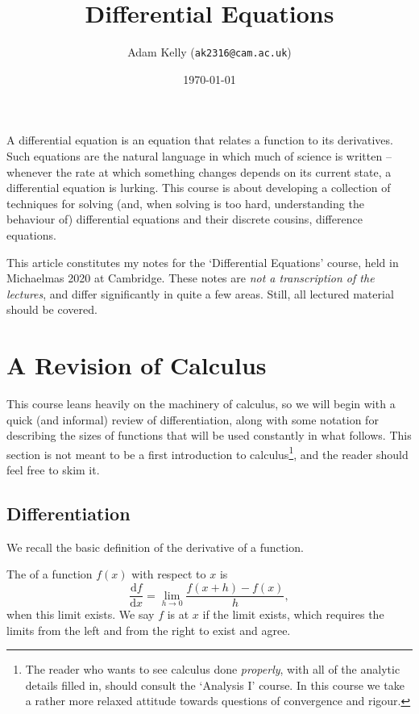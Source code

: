\documentclass[a4paper]{scrartcl}
\title{Differential Equations}
\author{Adam Kelly (\texttt{ak2316@cam.ac.uk})}
\date{\today}
\begin{document}
\maketitle

A differential equation is an equation that relates a function to its derivatives. Such equations are the natural language in which much of science is written -- whenever the rate at which something changes depends on its current state, a differential equation is lurking. This course is about developing a collection of techniques for solving (and, when solving is too hard, understanding the behaviour of) differential equations and their discrete cousins, difference equations.

This article constitutes my notes for the `Differential Equations' course, held in Michaelmas 2020 at Cambridge. These notes are \emph{not a transcription of the lectures}, and differ significantly in quite a few areas. Still, all lectured material should be covered.

\tableofcontents

\section{A Revision of Calculus}

This course leans heavily on the machinery of calculus, so we will begin with a quick (and informal) review of differentiation, along with some notation for describing the sizes of functions that will be used constantly in what follows. This section is not meant to be a first introduction to calculus\footnote{The reader who wants to see calculus done \emph{properly}, with all of the analytic details filled in, should consult the `Analysis I' course. In this course we take a rather more relaxed attitude towards questions of convergence and rigour.}, and the reader should feel free to skim it.

\subsection{Differentiation}

We recall the basic definition of the derivative of a function.

\begin{definition}[Derivative]
	The  of a function $f(x)$ with respect to $x$ is
	$$
	\frac{\mathrm{d}f}{\mathrm{d}x} = \lim_{h \to 0} \frac{f(x + h) - f(x)}{h},
	$$
	when this limit exists. We say $f$ is  at $x$ if the limit exists, which requires the limits from the left and from the right to exist and agree.
\end{definition}
\end{document}
